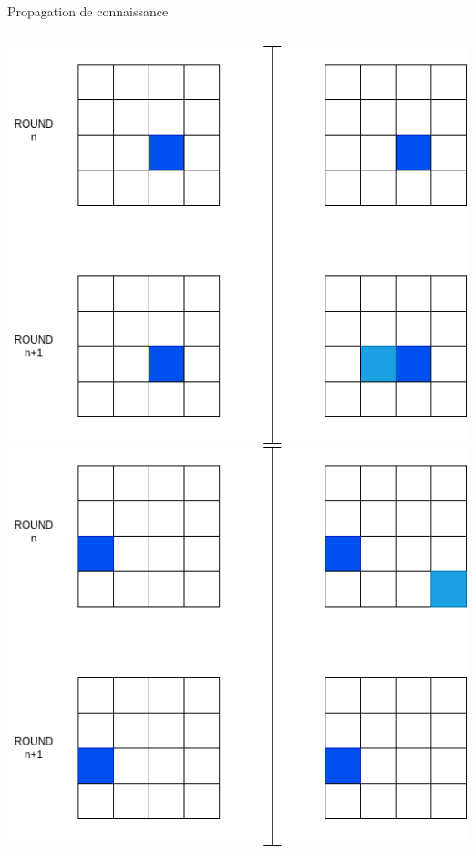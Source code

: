 \begin{frame}{Propagation de connaissance}
    \begin{columns}[T,onlytextwidth]
      \vspace{1cm}
        \includegraphics[width=\linewidth]{img/sca/aes-distrace/ex1.png}\\[1ex]
        \pause
        \vspace{1cm}
        \includegraphics[width=\linewidth]{img/sca/aes-distrace/ex4.png}
    \end{columns}
\end{frame}


